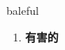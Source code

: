 
\begin{frame}
{\huge baleful}
\begin{center}
\begin{enumerate}\Large
  \item \textbf{有害的}
\end{enumerate}
\end{center}
\end{frame}

